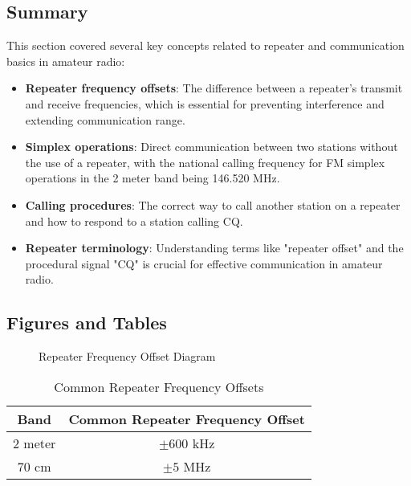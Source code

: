 \subsection*{Summary}
This section covered several key concepts related to repeater and communication basics in amateur radio:
\begin{itemize}
    \item \textbf{Repeater frequency offsets}: The difference between a repeater's transmit and receive frequencies, which is essential for preventing interference and extending communication range.
    \item \textbf{Simplex operations}: Direct communication between two stations without the use of a repeater, with the national calling frequency for FM simplex operations in the 2 meter band being 146.520 MHz.
    \item \textbf{Calling procedures}: The correct way to call another station on a repeater and how to respond to a station calling CQ.
    \item \textbf{Repeater terminology}: Understanding terms like "repeater offset" and the procedural signal "CQ" is crucial for effective communication in amateur radio.
\end{itemize}

\subsection*{Figures and Tables}

\begin{figure}[h!]
    \centering
    \caption{Repeater Frequency Offset Diagram}
    \label{fig:repeater_offset}
\end{figure}

\begin{table}[h!]
    \centering
    \begin{tabular}{|c|c|}
        \hline
        \textbf{Band} & \textbf{Common Repeater Frequency Offset} \\
        \hline
        2 meter & $\pm 600$ kHz \\
        70 cm & $\pm 5$ MHz \\
        \hline
    \end{tabular}
    \caption{Common Repeater Frequency Offsets}
    \label{tab:repeater_offsets}
\end{table}
